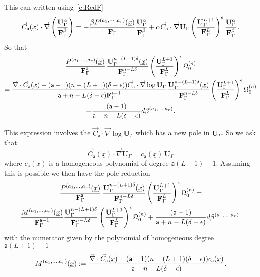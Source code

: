 \documentclass[a4paper,12pt]{article}
\numberwithin{equation}{section}
\numberwithin{figure}{section}
\begin{document}
This can written using~\eqref{e:RedF}
\begin{equation}
  \vec C_{\mathsf{a}}(\underline x)\cdot \vec\nabla \left(\mathbf{U}_\Gamma^{\alpha}\over
\mathbf{F}_\Gamma^\beta\right)=-{\beta
    P^{(a_1,\cdots,a_r)}(\underline x)\over
  \mathbf{F}_\Gamma}   {\mathbf{U}_\Gamma^{\alpha}\over
\mathbf{F}_\Gamma^\beta}
+
 \alpha \vec
C_{\mathsf{a}}\cdot \vec\nabla \mathbf{U}_\Gamma \left(\mathbf{U}_\Gamma^{L+1}\over
\mathbf{F}_\Gamma^L\right)^\epsilon  {\mathbf{U}_\Gamma^{\alpha}\over
\mathbf{F}_\Gamma^\beta}\,.
\end{equation}
So that
\begin{multline}
{  P^{(a_1,\dots,a_r)}(\underline x)\over \textbf{F}_\Gamma^{\mathsf{a}}}\, { \textbf{U}_\Gamma^{n-(L+1)\delta} (\underline x)\over \textbf{F}_\Gamma^{n-L\delta}}
  \left(\textbf{U}_\Gamma^{L+1}\over \textbf{F}_\Gamma^L\right)^{\epsilon} \Omega^{(n)}_0\cr={
\vec\nabla \cdot \vec C_{\mathsf{a}}
     (\underline x)
+    (\mathsf{a}-1)(n-(L+1)(\delta-\epsilon)) \vec
    C_{\mathsf{a}}\cdot\vec\nabla\log\mathbf{U}_\Gamma\over \mathsf{a}+n-L(\delta-\epsilon)\textbf{F}_\Gamma^{\mathsf{a}-1}}
{ \textbf{U}_\Gamma^{n-(L+1)\delta} (\underline x)\over \textbf{F}_\Gamma^{n-L\delta}}
  \left(\textbf{U}_\Gamma^{L+1}\over \textbf{F}_\Gamma^L\right)^{\epsilon} 
  \Omega_0^{(n)}\cr
+{  (\mathsf{a}-1) \over \mathsf{a}+n-L(\delta-\epsilon)} d\beta^{(a_1,\dots,a_r)}.
\end{multline}

This expression involves the $\vec
    C_{\mathsf{a}}\cdot\vec\nabla\log\mathbf{U}_\Gamma$ which has a
    new pole in $\mathbf{U}_\Gamma$. So we ask that
    \begin{equation}
      \label{e:RedU}
      \vec
    C_{\mathsf{a}}(\underline x)\cdot\vec\nabla \mathbf{U}_\Gamma =
    c_{\mathsf{a}}(\underline x) \, \mathbf{U}_\Gamma
    \end{equation}
where $ c_{\mathsf{a}}(\underline x)$ is a homogeneous polynomial of
degree $\mathsf{a}(L+1)-1$. Assuming this is possible we then have the
pole reduction
\begin{multline}\label{e:RedFinal}
{  P^{(a_1,\dots,a_r)}(\underline x)\over \textbf{F}_\Gamma^{\mathsf{a}}}\, { \textbf{U}_\Gamma^{n-(L+1)\delta} (\underline x)\over \textbf{F}_\Gamma^{n-L\delta}}
  \left(\textbf{U}_\Gamma^{L+1}\over \textbf{F}_\Gamma^L\right)^{\epsilon} \Omega^{(n)}_0=\cr{
M^{(a_1,\dots,a_r)}
     (\underline x)
\over \textbf{F}_\Gamma^{\mathsf{a}-1}}
{ \textbf{U}_\Gamma^{n-(L+1)\delta}\over \textbf{F}_\Gamma^{n-L\delta}}
  \left(\textbf{U}_\Gamma^{L+1}\over \textbf{F}_\Gamma^L\right)^{\epsilon} 
  \Omega_0^{(n)}
+{  (\mathsf{a}-1) \over \mathsf{a}+n-L(\delta-\epsilon)} d\beta^{(a_1,\dots,a_r)}.
\end{multline}
with the numerator given by the polynomial of homogeneous degree $\mathsf{a}(L+1)-1$
\begin{equation}
  \label{e:Mfinal}
  M^{(a_1,\dots,a_r)}(\underline x):={\vec\nabla \cdot \vec C_{\mathsf{a}}
     (\underline x)
+    (\mathsf{a}-1)(n-(L+1)(\delta-\epsilon)) 
    c_{\mathsf{a}}(\underline x)\over \mathsf{a}+n-L(\delta-\epsilon) }.
\end{equation}
\end{document}
